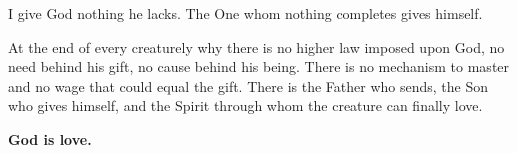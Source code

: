 I give God nothing he lacks. The One whom nothing completes gives himself.

At the end of every creaturely why there is no higher law imposed upon God, no need behind his gift, no cause behind his being. There is no mechanism to master and no wage that could equal the gift. There is the Father who sends, the Son who gives himself, and the Spirit through whom the creature can finally love.

\vspace{1.2\baselineskip}
\begin{center}
{\Large\bfseries God is love.}
\end{center}
